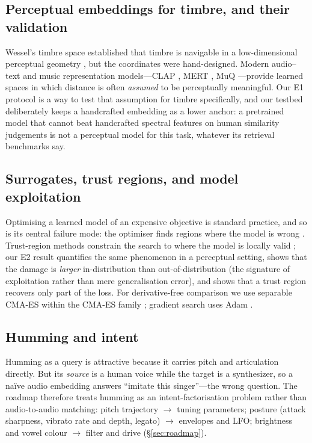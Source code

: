 \documentclass[11pt]{article}
\begin{document}
\subsection{Perceptual embeddings for timbre, and their validation}

Wessel's timbre space established that timbre is navigable in a low-dimensional
perceptual geometry \cite{wessel}, but the coordinates were hand-designed.
Modern audio--text and music representation models---CLAP \cite{clap}, MERT
\cite{mert}, MuQ \cite{muq}---provide learned spaces in which distance is often
\emph{assumed} to be perceptually meaningful. Our E1 protocol is a way to test
that assumption for timbre specifically, and our testbed deliberately keeps a
handcrafted embedding as a lower anchor: a pretrained model that cannot beat
handcrafted spectral features on human similarity judgements is not a
perceptual model for this task, whatever its retrieval benchmarks say.

\subsection{Surrogates, trust regions, and model exploitation}

Optimising a learned model of an expensive objective is standard practice, and
so is its central failure mode: the optimiser finds regions where the model is
wrong \cite{turbo}. Trust-region methods constrain the search to where the model
is locally valid \cite{turbo}; our E2 result quantifies the same phenomenon in a
perceptual setting, shows that the damage is \emph{larger} in-distribution than
out-of-distribution (the signature of exploitation rather than mere
generalisation error), and shows that a trust region recovers only part of the
loss. For derivative-free comparison we use separable CMA-ES \cite{sepcma}
within the CMA-ES family \cite{cmakes}; gradient search uses Adam \cite{adam}.

\subsection{Humming and intent}

Humming as a query is attractive because it carries pitch and articulation
directly. But its \emph{source} is a human voice while the target is a
synthesizer, so a na\"ive audio embedding answers ``imitate this singer''---the
wrong question. The roadmap therefore treats humming as an
intent-factorisation problem rather than audio-to-audio matching: pitch
trajectory $\rightarrow$ tuning parameters; posture (attack sharpness, vibrato
rate and depth, legato) $\rightarrow$ envelopes and LFO; brightness and vowel
colour $\rightarrow$ filter and drive (\S\ref{sec:roadmap}).
\end{document}
